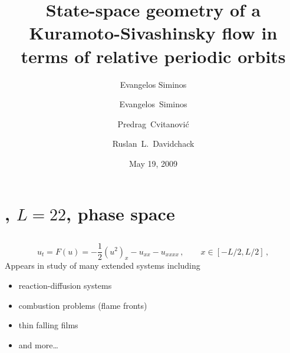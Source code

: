 \documentclass{beamer}
\title{State-space geometry of a Kuramoto-Sivashinsky flow in terms of relative periodic orbits}
\author{Evangelos Siminos}
\author[Siminos, Cvitanovi\'c, Davidchack]
{
  \textcolor{green!50!black}{Evangelos~Siminos}\inst{1} \and
  {Predrag~Cvitanovi\'c}\inst{1} \and
  {Ruslan~L.~Davidchack}\inst{2}
}
\institute
{
  \inst{1}%
  Georgia Institute of Technology
  \and
  \vskip-2mm
  \inst{2}%
  University of Leicester, United Kingdom
}
\date{May 19, 2009}
\begin{document}
\begin{frame}
  \titlepage
\end{frame}


\section[\KSe]{\KS, $L=22$, phase space }

\subsection{\KSe}

\begin{frame}{\KSe}
\[
  u_t = F(u) = -{\textstyle\frac{1}{2}}(u^2)_x-u_{xx}-u_{xxxx}
    \,,\qquad   x \in [-L/2,L/2]
    \,,
\]
Appears in study of many extended systems including
\begin{itemize}
 \item reaction-diffusion systems
 \item combustion problems (flame fronts)
 \item thin falling films
 \item and more\ldots
\end{itemize}

\end{frame}
\end{document}
